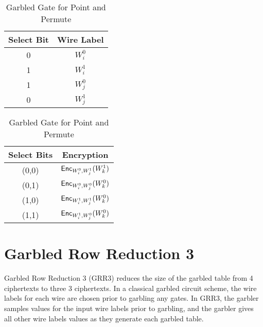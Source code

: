
\begin{table}
    \label{tbl:point-and-permute}
    \centering
    \begin{tabular}{|c|c|}
        \hline
        Select Bit & Wire Label \\
        \hline
        0 & $W_i^0$ \\
        1 & $W_i^1$ \\
        1 & $W_j^0$ \\
        0 & $W_j^1$ \\
        \hline
    \end{tabular}
    \qquad
    \begin{tabular}{|c|c|}
        \hline
        Select Bits & Encryption \\
        \hline
        (0,0) & $\textsf{Enc}_{W_i^0, W_j^1}(W_k^1)$ \\
        (0,1) & $\textsf{Enc}_{W_i^0, W_j^0}(W_k^0)$ \\
        (1,0) & $\textsf{Enc}_{W_i^1, W_j^1}(W_k^0)$ \\
        (1,1) & $\textsf{Enc}_{W_i^1, W_j^0}(W_k^0)$ \\
        \hline
    \end{tabular}
    \caption{Garbled Gate for Point and Permute}
\end{table}

\section{Garbled Row Reduction 3}
Garbled Row Reduction 3 (GRR3) reduces the size of the garbled table from 4 ciphertexts to three 3 ciphertexts.
In a classical garbled circuit scheme, the wire labels for each wire are chosen prior to garbling any gates.
In GRR3, the garbler samples values for the input wire labels prior to garbling, and the garbler gives all other wire labels values as they generate each garbled table.

